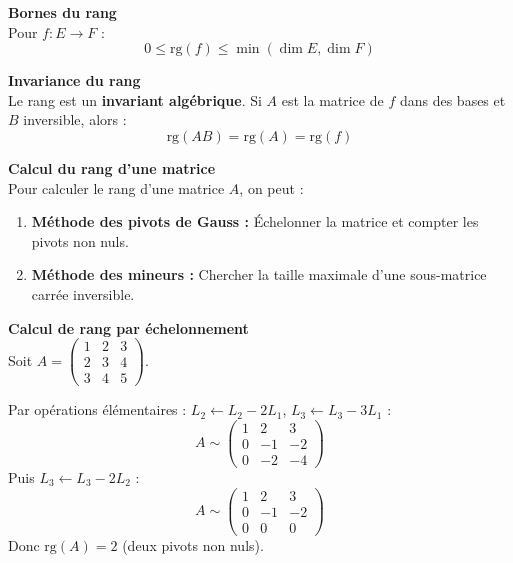 \documentclass[../PolyS4.tex]{subfiles}
\begin{document}
\begin{Prop}\textbf{Bornes du rang}\\

Pour $f : E \to F$ :
$$0 \leq \text{rg}(f) \leq \min(\dim E, \dim F)$$
\end{Prop}

\begin{Prop}\textbf{Invariance du rang}\\

Le rang est un \textbf{invariant algébrique}. Si $A$ est la matrice de $f$ dans des bases et $B$ inversible, alors :
$$\text{rg}(AB) = \text{rg}(A) = \text{rg}(f)$$
\end{Prop}

\begin{Meth}\textbf{Calcul du rang d'une matrice}\\

Pour calculer le rang d'une matrice $A$, on peut :
\begin{enumerate}
    \item \textbf{Méthode des pivots de Gauss :} Échelonner la matrice et compter les pivots non nuls.
    \item \textbf{Méthode des mineurs :} Chercher la taille maximale d'une sous-matrice carrée inversible.
\end{enumerate}
\end{Meth}

\begin{Ex}\textbf{Calcul de rang par échelonnement}\\

Soit $A = \begin{pmatrix} 1 & 2 & 3 \\ 2 & 3 & 4 \\ 3 & 4 & 5 \end{pmatrix}$.

Par opérations élémentaires : $L_2 \leftarrow L_2 - 2L_1$, $L_3 \leftarrow L_3 - 3L_1$ :
$$A \sim \begin{pmatrix} 1 & 2 & 3 \\ 0 & -1 & -2 \\ 0 & -2 & -4 \end{pmatrix}$$
Puis $L_3 \leftarrow L_3 - 2L_2$ :
$$A \sim \begin{pmatrix} 1 & 2 & 3 \\ 0 & -1 & -2 \\ 0 & 0 & 0 \end{pmatrix}$$
Donc $\text{rg}(A) = 2$ (deux pivots non nuls).
\end{Ex}
\end{document}
